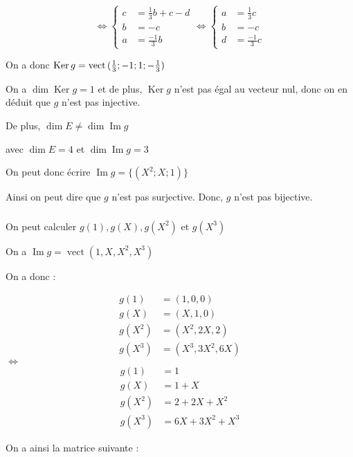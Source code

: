 \documentclass[a4paper,12pt]{article}
\DeclareMathOperator{\Ker}{Ker}
\DeclareMathOperator{\Img}{Im}
\DeclareMathOperator{\vect}{vect}
\DeclareMathOperator{\di}{dim}
\begin{document}
\[
  \Leftrightarrow
  \left\{\begin{array}{rl}
    c & = \frac{1}{3}b +c-d \\
    b & = -c                \\
    a & = \frac{-1}{3}b
  \end{array}\right.
  \Leftrightarrow
  \left\{\begin{array}{rl}
    a & = \frac{1}{3}c  \\
    b & = -c            \\
    d & = \frac{-1}{3}c
  \end{array}\right.
\]

On a donc $\Ker g = \vect{(\frac{1}{3};-1;1;-\frac{1}{3})} \\$

On a $\di \Ker g = 1$ et de plus, $\Ker g$ n'est pas égal au vecteur nul, donc
on en déduit que $g$ n'est pas injective.

De plus, $\di E \neq \di \Img g$

avec $\di E = 4$ et $\di \Img g = 3$

On peut donc écrire $\Img g = \{(X^2;X;1)\}$

Ainsi on peut dire que $g$ n'est pas surjective. Donc, $g$ n'est pas bijective.


\subsubsection{}

On peut calculer $g(1),g(X),g(X^2) \mbox{ et } g(X^3)$

On a $\Img g = \vect{(1,X,X^2,X^3)}$

On a donc : 

\begin{align*}
  g(1)   & =(1,0,0)       \\
  g(X)   & =(X,1,0)       \\
  g(X^2) & =(X^2,2X,2)    \\
  g(X^3) & =(X^3,3X^2,6X)
\end{align*}
$\Leftrightarrow$
\begin{align*}
    g(1)&=1 \\
    g(X)&=1+X\\
    g(X^2)&=2+2X+X^2\\
    g(X^3)&=6X+3X^2+X^3
\end{align*}

On a ainsi la matrice suivante :
\end{document}

